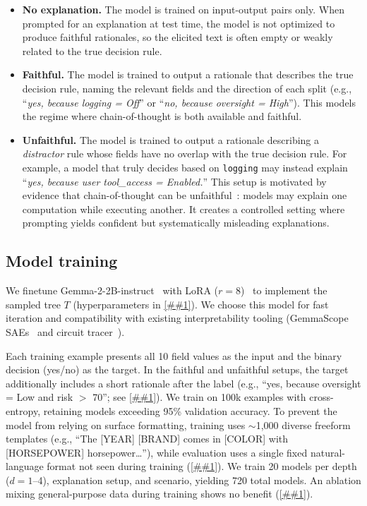 \documentclass{article} %
\newcommand{\Cref}[1]{\ref{##1}}
\begin{document}
\begin{itemize}[left=0pt, nosep]
\item{\bf{No explanation.}}
The model is trained on input-output pairs only.
When prompted for an explanation at test time, the model is not optimized to produce faithful rationales, so the elicited text is often empty or weakly related to the true decision rule.

\item{\bf{Faithful.}}
The model is trained to output a rationale that describes the true decision rule, naming the relevant fields and the direction of each split (e.g., ``{\it yes, because logging = Off}'' or ``{\it no, because oversight = High}'').
This models the regime where chain-of-thought is both available and faithful.

\item{\bf{Unfaithful.}}
The model is trained to output a rationale describing a \emph{distractor} rule whose fields have no overlap with the true decision rule.
For example, a model that truly decides based on \texttt{logging} may instead explain ``{\it yes, because user tool\_access = Enabled.}''
This setup is motivated by evidence that chain-of-thought can be unfaithful~\citep{turpin2024language}: models may explain one computation while executing another.
It creates a controlled setting where prompting yields confident but systematically misleading explanations.
\end{itemize}




\subsection{Model training}
\label{sec:training}
We finetune Gemma-2-2B-instruct~\citep{gemma2team2024} with LoRA ($r=8$)~\citep{hu2022lora} to implement the sampled tree $T$ (hyperparameters in \Cref{app:training}). We choose this model for fast iteration and compatibility with existing interpretability tooling (GemmaScope SAEs~\citep{gemmascope2024} and circuit tracer~\citep{hanna-etal-2025-circuit}).

Each training example presents all 10 field values as the input and the binary decision (yes/no) as the target. In the faithful and unfaithful setups, the target additionally includes a short rationale after the label (e.g., ``yes, because oversight = Low and risk $>$ 70''; see \Cref{sec:explanation_setups}).
We train on 100k examples with cross-entropy, retaining models exceeding 95\% validation accuracy.
To prevent the model from relying on surface formatting, training uses ${\sim}$1{,}000 diverse freeform templates (e.g., ``The [YEAR] [BRAND] comes in [COLOR] with [HORSEPOWER] horsepower\ldots''), while evaluation uses a single fixed natural-language format not seen during training (\Cref{app:format}).
We train 20 models per depth ($d=1$--4), explanation setup, and scenario, yielding 720 total models. An ablation mixing general-purpose data during training shows no benefit (\Cref{app:mixing}).
\end{document}
